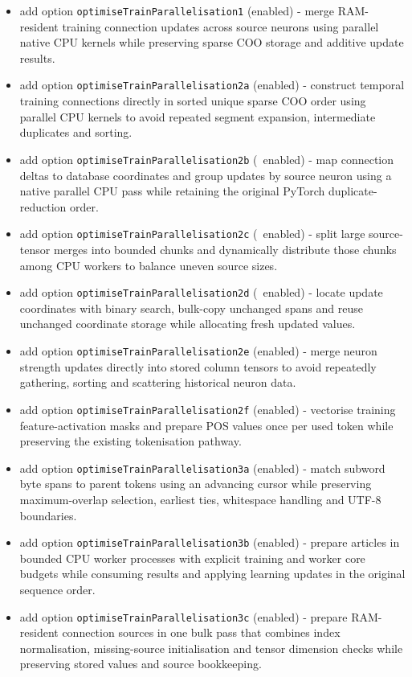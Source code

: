 \begin{itemize}
	\item add option \texttt{optimiseTrainParallelisation1} (enabled) - merge RAM-resident training connection updates across source neurons using parallel native CPU kernels while preserving sparse COO storage and additive update results.
	\item add option \texttt{optimiseTrainParallelisation2a} (enabled) - construct temporal training connections directly in sorted unique sparse COO order using parallel CPU kernels to avoid repeated segment expansion, intermediate duplicates and sorting.
	\item add option \texttt{optimiseTrainParallelisation2b} (~enabled) - map connection deltas to database coordinates and group updates by source neuron using a native parallel CPU pass while retaining the original PyTorch duplicate-reduction order.
	\item add option \texttt{optimiseTrainParallelisation2c} (~enabled) - split large source-tensor merges into bounded chunks and dynamically distribute those chunks among CPU workers to balance uneven source sizes.
	\item add option \texttt{optimiseTrainParallelisation2d} (~enabled) - locate update coordinates with binary search, bulk-copy unchanged spans and reuse unchanged coordinate storage while allocating fresh updated values.
	\item add option \texttt{optimiseTrainParallelisation2e} (enabled) - merge neuron strength updates directly into stored column tensors to avoid repeatedly gathering, sorting and scattering historical neuron data.
	\item add option \texttt{optimiseTrainParallelisation2f} (enabled) - vectorise training feature-activation masks and prepare POS values once per used token while preserving the existing tokenisation pathway.
	\item add option \texttt{optimiseTrainParallelisation3a} (enabled) - match subword byte spans to parent tokens using an advancing cursor while preserving maximum-overlap selection, earliest ties, whitespace handling and UTF-8 boundaries.
	\item add option \texttt{optimiseTrainParallelisation3b} (enabled) - prepare articles in bounded CPU worker processes with explicit training and worker core budgets while consuming results and applying learning updates in the original sequence order.
	\item add option \texttt{optimiseTrainParallelisation3c} (enabled) - prepare RAM-resident connection sources in one bulk pass that combines index normalisation, missing-source initialisation and tensor dimension checks while preserving stored values and source bookkeeping.

\end{itemize}
